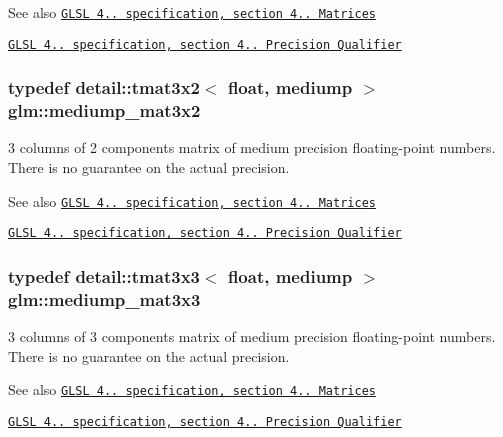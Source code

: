 \begin{DoxySeeAlso}{See also}
\href{http://www.opengl.org/registry/doc/GLSLangSpec.4.20.8.pdf}{\tt G\+L\+SL 4.. specification, section 4.. Matrices} 

\href{http://www.opengl.org/registry/doc/GLSLangSpec.4.20.8.pdf}{\tt G\+L\+SL 4.. specification, section 4.. Precision Qualifier} 
\end{DoxySeeAlso}
\subsubsection[{\texorpdfstring{mediump\+\_\+mat3x2}{mediump_mat3x2}}]{\setlength{\rightskip}{0pt plus 5cm}typedef detail\+::tmat3x2$<$ float, mediump $>$ {\bf glm\+::mediump\+\_\+mat3x2}}\hypertarget{group__core__precision_ga1215b70c2750b6e9ab813ced8dcae568}{}\label{group__core__precision_ga1215b70c2750b6e9ab813ced8dcae568}
3 columns of 2 components matrix of medium precision floating-\/point numbers. There is no guarantee on the actual precision.

\begin{DoxySeeAlso}{See also}
\href{http://www.opengl.org/registry/doc/GLSLangSpec.4.20.8.pdf}{\tt G\+L\+SL 4.. specification, section 4.. Matrices} 

\href{http://www.opengl.org/registry/doc/GLSLangSpec.4.20.8.pdf}{\tt G\+L\+SL 4.. specification, section 4.. Precision Qualifier} 
\end{DoxySeeAlso}
\subsubsection[{\texorpdfstring{mediump\+\_\+mat3x3}{mediump_mat3x3}}]{\setlength{\rightskip}{0pt plus 5cm}typedef detail\+::tmat3x3$<$ float, mediump $>$ {\bf glm\+::mediump\+\_\+mat3x3}}\hypertarget{group__core__precision_gae4c7f0d5d3dab712f9a671183e63e5ab}{}\label{group__core__precision_gae4c7f0d5d3dab712f9a671183e63e5ab}
3 columns of 3 components matrix of medium precision floating-\/point numbers. There is no guarantee on the actual precision.

\begin{DoxySeeAlso}{See also}
\href{http://www.opengl.org/registry/doc/GLSLangSpec.4.20.8.pdf}{\tt G\+L\+SL 4.. specification, section 4.. Matrices} 

\href{http://www.opengl.org/registry/doc/GLSLangSpec.4.20.8.pdf}{\tt G\+L\+SL 4.. specification, section 4.. Precision Qualifier} 
\end{DoxySeeAlso}
